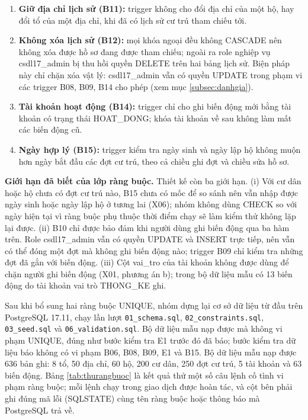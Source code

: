 \begin{enumerate}[leftmargin=*]
    \item \textbf{Giữ địa chỉ lịch sử (B11):} trigger không cho đổi địa chỉ của một hộ, hay đổi tổ của một địa chỉ, khi đã có lịch sử cư trú tham chiếu tới.
    \item \textbf{Không xóa lịch sử (B12):} mọi khóa ngoại đều không CASCADE nên không xóa được hồ sơ đang được tham chiếu; ngoài ra role nghiệp vụ csdl17\_admin bị thu hồi quyền DELETE trên hai bảng lịch sử. Biện pháp này chỉ chặn xóa vật lý: csdl17\_admin vẫn có quyền UPDATE trong phạm vi các trigger B08, B09, B14 cho phép (xem mục \ref{subsec:danhgia}).
    \item \textbf{Tài khoản hoạt động (B14):} trigger chỉ cho ghi biến động mới bằng tài khoản có trạng thái HOAT\_DONG; khóa tài khoản về sau không làm mất các biến động cũ.
    \item \textbf{Ngày hợp lý (B15):} trigger kiểm tra ngày sinh và ngày lập hộ không muộn hơn ngày bắt đầu các đợt cư trú, theo cả chiều ghi đợt và chiều sửa hồ sơ.
\end{enumerate}

\textbf{Giới hạn đã biết của lớp ràng buộc.} Thiết kế còn ba giới hạn. (i) Với cư dân hoặc hộ chưa có đợt cư trú nào, B15 chưa có mốc để so sánh nên vẫn nhập được ngày sinh hoặc ngày lập hộ ở tương lai (X06); nhóm không dùng CHECK so với ngày hiện tại vì ràng buộc phụ thuộc thời điểm chạy sẽ làm kiểm thử không lặp lại được. (ii) B10 chỉ được bảo đảm khi người dùng ghi biến động qua ba hàm trên. Role csdl17\_admin vẫn có quyền UPDATE và INSERT trực tiếp, nên vẫn có thể đóng một đợt mà không ghi biến động nào; trigger B09 chỉ kiểm tra những đợt đã gắn với biến động. (iii) Cột vai\_tro của tài khoản không được dùng để chặn người ghi biến động (X01, phương án b); trong bộ dữ liệu mẫu có 13 biến động do tài khoản vai trò THONG\_KE ghi.

Sau khi bổ sung hai ràng buộc UNIQUE, nhóm dựng lại cơ sở dữ liệu từ đầu trên PostgreSQL 17.11, chạy lần lượt \texttt{01\_schema.sql}, \texttt{02\_constraints.sql}, \texttt{03\_seed.sql} và \texttt{06\_validation.sql}. Bộ dữ liệu mẫu nạp được mà không vi phạm UNIQUE, đúng như bước kiểm tra E1 trước đó đã báo; bước kiểm tra dữ liệu báo không có vi phạm B06, B08, B09, E1 và B15. Bộ dữ liệu mẫu nạp được 636 bản ghi: 8 tổ, 50 địa chỉ, 60 hộ, 200 cư dân, 250 đợt cư trú, 5 tài khoản và 63 biến động. Bảng \ref{tab:thurangbuoc} là kết quả thử một số câu lệnh cố tình vi phạm ràng buộc; mỗi lệnh chạy trong giao dịch được hoàn tác, và cột bên phải ghi đúng mã lỗi (SQLSTATE) cùng tên ràng buộc hoặc thông báo mà PostgreSQL trả về.

